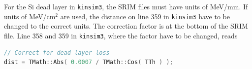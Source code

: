 \documentclass[twoside,english]{uiofysmaster/uiofysmaster}
\begin{document}
\begin{appendices}
For the Si dead layer in \texttt{kinsim3}, the SRIM files must have units of MeV/mm. 
If units of MeV/cm$^2$ are used, the distance on line 359 in \texttt{kinsim3} have to be changed to the correct units. 
The correction factor is at the bottom of the SRIM file.
Line 358 and 359 in \texttt{kinsim3}, where the factor have to be changed, reads
\begin{lstlisting}[language=c++]
// Correct for dead layer loss
dist = TMath::Abs( 0.0007 / TMath::Cos( TTh ) );
\end{lstlisting}







\end{appendices}


%


\end{document}
